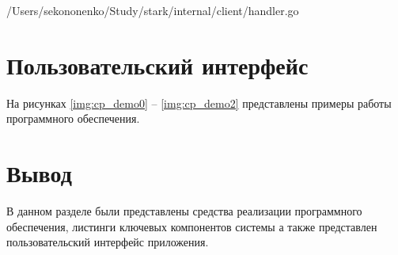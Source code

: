 \begin{lstinputlisting}[
	caption={Обработка команд и обновление состояния на стороне клиента},
	label={lst:handlers},
	style={go},
	linerange={17-201},
	]{/Users/sekononenko/Study/stark/internal/client/handler.go}
\end{lstinputlisting}

\section{Пользовательский интерфейс}

На рисунках \ref{img:cp_demo0} -- \ref{img:cp_demo2} представлены примеры работы программного обеспечения.




\section*{Вывод}

В данном разделе были представлены средства реализации программного обеспечения, листинги ключевых компонентов системы а также представлен пользовательский интерфейс приложения.
